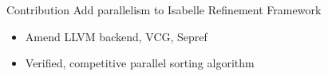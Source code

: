 \documentclass[fleqn]{beamer}
\begin{document}
\begin{frame}{Contribution}
  Add parallelism to Isabelle Refinement Framework
  \begin{itemize}
   \item Amend LLVM backend, VCG, Sepref
   \item Verified, competitive parallel sorting algorithm


  \end{itemize}



\end{frame}
\end{document}

